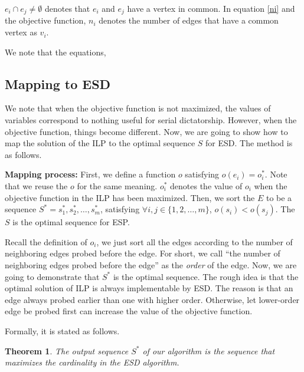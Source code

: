 \documentclass[letterpaper]{article}
\newtheorem{theorem}{Theorem}%
\begin{document}
 $e_i\cap e_j\neq \emptyset$ denotes that $e_i$ and $e_j$ have a vertex in common. 
In equation \ref{ni} and the objective function, $n_i$ denotes the number of edges that have a common vertex as $v_i$.

We note that the equations, 

\subsection{Mapping to ESD}
We note that when the objective function is not maximized, the values of variables correspond to nothing useful for serial dictatorship.
However, when the objective function, things become different.
Now, we are going to show how to map the solution of the ILP to the optimal sequence $S$ for ESD.
The method is as follows.

\textbf{Mapping process: }First, we define a function $o$ satisfying $o(e_i)=o_i^*$. 
Note that we reuse the $o$ for the same meaning.
$o_i^*$ denotes the value of $o_i$ when the objective function in the ILP has been maximized.
Then, we sort the $E$ to be a sequence $S^*=s_1^*,s_2^*,\ldots,s_m^*$, satisfying $\forall i,j\in\{1,2,\ldots,m\}$, $o(s_i)<o(s_j)$.
The $S$ is the optimal sequence for ESP.

Recall the definition of $o_i$, we just sort all the edges according to the number of neighboring edges probed before the edge.
For short, we call ``the number of neighboring edges probed before the edge'' as the \textit{order} of the edge.
Now, we are going to demonstrate that $S^*$ is the optimal sequence.
The rough idea is that the optimal solution of ILP is always implementable by ESD.
The reason is that an edge always probed earlier than one with higher order.
Otherwise, let lower-order edge be probed first can increase the value of the objective function.

Formally, it is stated as follows.

\begin{theorem}
	The output sequence $S^*$ of our algorithm is the sequence that maximizes the cardinality in the ESD algorithm.
\end{theorem}
\end{document}

